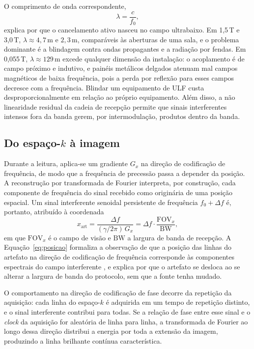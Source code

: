 \documentclass[portuguese]{sbcreviews-2025}%
\begin{document}
O comprimento de onda correspondente,
\begin{equation}
\lambda = \frac{c}{f_0} ,
\label{eq:lambda}
\end{equation}
explica por que o cancelamento ativo nasceu no campo ultrabaixo. Em 1,5\,T e 3,0\,T, $\lambda \approx 4{,}7$\,m e $2{,}3$\,m, comparáveis às aberturas de uma sala, e o problema dominante é a blindagem contra ondas propagantes e a radiação por fendas. Em 0,055\,T, $\lambda \approx 129$\,m excede qualquer dimensão da instalação: o acoplamento é de campo próximo e indutivo, e painéis metálicos delgados atenuam mal campos magnéticos de baixa frequência, pois a perda por reflexão para esses campos decresce com a frequência. Blindar um equipamento de ULF custa desproporcionalmente em relação ao próprio equipamento. Além disso, a não linearidade residual da cadeia de recepção \citep{zanche2018rf} permite que sinais interferentes intensos fora da banda gerem, por intermodulação, produtos dentro da banda.

\subsection{Do espaço-$k$ à imagem}
\label{subsec:kspace}

Durante a leitura, aplica-se um gradiente $G_x$ na direção de codificação de frequência, de modo que a frequência de precessão passa a depender da posição. A reconstrução por transformada de Fourier interpreta, por construção, cada componente de frequência do sinal recebido como originária de uma posição espacial. Um sinal interferente senoidal persistente de frequência $f_0 + \Delta f$ é, portanto, atribuído à coordenada
\begin{equation}
x_{\text{art}} = \frac{\Delta f}{(\gamma/2\pi)\,G_x} = \Delta f \cdot \frac{\mathrm{FOV}_x}{\mathrm{BW}} ,
\label{eq:posicao}
\end{equation}
em que $\mathrm{FOV}_x$ é o campo de visão e $\mathrm{BW}$ a largura de banda de recepção. A Equação~\eqref{eq:posicao} formaliza a observação de que a posição das linhas do artefato na direção de codificação de frequência corresponde às componentes espectrais do campo interferente \citep{kwok2024rf}, e explica por que o artefato se desloca ao se alterar a largura de banda do protocolo, sem que a fonte tenha mudado.

O comportamento na direção de codificação de fase decorre da repetição da aquisição: cada linha do espaço-$k$ é adquirida em um tempo de repetição distinto, e o sinal interferente contribui para todas. Se a relação de fase entre esse sinal e o \textit{clock} da aquisição for aleatória de linha para linha, a transformada de Fourier ao longo dessa direção distribui a energia por toda a extensão da imagem, produzindo a linha brilhante contínua característica.
\end{document}
